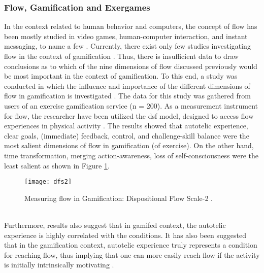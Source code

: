 \subsubsection{Flow, Gamification and Exergames}
In the context related to human behavior and computers, the concept of flow has been mostly studied in video games, human-computer interaction, and instant messaging, to name a few \cite{hamari2014measuring}. Currently, there exist only few studies investigating flow in the context of gamification \cite{hamari2014measuring, sillaots2014achieving}. Thus, there is insufficient data to draw conclusions as to which of the nine dimensions of flow discussed previously would be most important in the context of gamification. To this end, a study was conducted in which the influence and importance of the different dimensions of flow in gamification is investigated \cite{hamari2014measuring}. The data for this study was gathered from users of an exercise gamification service (n = 200). As a measurement instrument for flow, the researcher have been utilized the \acrfull{dsf} model, designed to access flow experiences in physical activity \cite{jackson2002assessing}. The results showed that autotelic experience, clear goals, (immediate) feedback, control, and challenge-skill balance were the most salient dimensions of flow in gamification (of exercise). On the other hand, time transformation, merging action-awareness, loss of self-consciousness were the least salient as shown in Figure \ref{fig:dfs2}.\\
\begin{figure}[h]
    \centering
    \texttt{[image: dfs2]}
    \caption{Measuring flow in Gamification: Dispositional Flow Scale-2 \cite{dfs2}.}
    \label{fig:dfs2}
\end{figure}\\
Furthermore, results also suggest that in gamifed context, the autotelic experience is highly correlated with the conditions. It has also been suggested that in the gamification context, autotelic experience truly represents a condition for reaching flow, thus implying that one can more easily reach flow if the activity is initially intrinsically motivating \cite{hamari2014measuring}.\\\\
